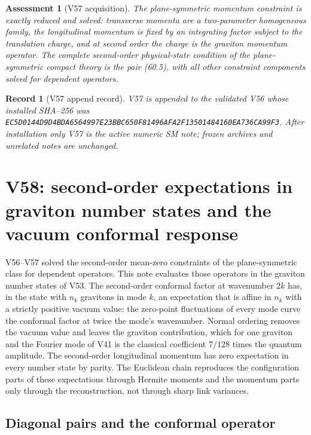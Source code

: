 \documentclass[11pt]{article}
\newtheorem{assessment}[theorem]{Assessment}
\newtheorem{record}[theorem]{Record}
\theoremstyle{remark}
\begin{document}
\begin{assessment}[V57 acquisition]
\label{ass:v19v57}
The plane-symmetric momentum constraint is exactly reduced and solved:
transverse momenta are a two-parameter homogeneous family, the
longitudinal momentum is fixed by an integrating factor subject to the
translation charge, and at second order the charge is the graviton
momentum operator.  The complete second-order physical-state condition
of the plane-symmetric compact theory is the pair (60.5), with all
other constraint components solved for dependent operators.
\end{assessment}

\begin{record}[V57 append record]
\label{rec:v19v57}
V57 is appended to the validated V56 whose installed SHA--256 was
\texttt{EC5D0144D9D4BDA6564997E23BBC650F81496AFA2F13501484160EA736CA99F3}.
After installation only V57 is the active numeric SM note; frozen
archives and unrelated notes are unchanged.
\end{record}


\section{V58: second-order expectations in graviton number states and the vacuum conformal response}
\label{sec:v19v58}

V56--V57 solved the second-order mean-zero constraints of the
plane-symmetric class for dependent operators.  This note evaluates
those operators in the graviton number states of V53.  The
second-order conformal factor at wavenumber \(2k\) has, in the state
with \(n_k\) gravitons in mode \(k\), an expectation that is affine in
\(n_k\) with a strictly positive vacuum value: the zero-point
fluctuations of every mode curve the conformal factor at twice the
mode's wavenumber.  Normal ordering removes the vacuum value and leaves
the graviton contribution, which for one graviton and the Fourier mode
of V41 is the classical coefficient \(7/128\) times the quantum
amplitude.  The second-order longitudinal momentum has zero expectation
in every number state by parity.  The Euclidean chain reproduces the
configuration parts of these expectations through Hermite moments and
the momentum parts only through the reconstruction, not through sharp
link variances.

\subsection{Diagonal pairs and the conformal operator}
\end{document}
